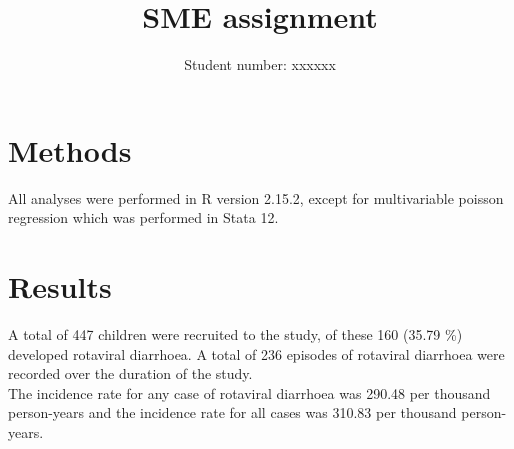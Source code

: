 \documentclass[11pt,a4paper,twoside]{article}\usepackage{graphicx, color}
\title{SME assignment}
\author{Student number: xxxxxx}
\makeatletter
\newenvironment{kframe}{%
 \def\at@end@of@kframe{}%
 \ifinner\ifhmode%
  \def\at@end@of@kframe{\end{minipage}}%
  \begin{minipage}{\columnwidth}%
 \fi\fi%
 \def\FrameCommand##1{\hskip\@totalleftmargin \hskip-\fboxsep
 \colorbox{shadecolor}{##1}\hskip-\fboxsep
     \hskip-\linewidth \hskip-\@totalleftmargin \hskip\columnwidth}%
 \MakeFramed {\advance\hsize-\width
   \@totalleftmargin\z@ \linewidth\hsize
   \@setminipage}}%
 {\par\unskip\endMakeFramed%
 \at@end@of@kframe}
\makeatother
\begin{document}
\section{Methods}
\begin{kframe}


{\ttfamily\noindent\color{warningcolor}{\#\# Warning: package 'foreign' was built under R version 2.15.3}}\end{kframe}

All analyses were performed in R version 2.15.2, except for multivariable poisson regression which was performed in Stata 12.\\
\section{Results}
A total of 447 children were recruited to the study, of these 160 (35.79 \%) developed rotaviral diarrhoea. 
A total of 236 episodes of rotaviral diarrhoea were recorded over the duration of the study.\\
The incidence rate for any case of rotaviral diarrhoea was 290.48 per thousand person-years and the incidence rate for all cases was 310.83 per thousand person-years.\\ 
\end{document}
